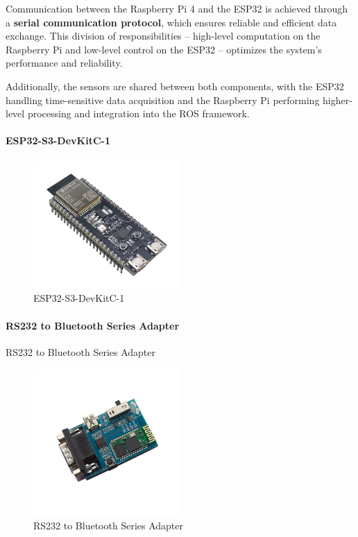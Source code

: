 \documentclass[../../main]{subfiles}
\begin{document}
Communication between the Raspberry Pi 4 and the ESP32 is achieved 
through a \textbf{serial communication protocol}, which ensures 
reliable and efficient data exchange. This division of responsibilities 
-- high-level computation on the Raspberry Pi and low-level control 
on the ESP32 -- optimizes the system's performance and reliability.

Additionally, the sensors are shared between both components, with 
the ESP32 handling time-sensitive data acquisition and the Raspberry 
Pi performing higher-level processing and integration into the ROS 
framework.

\paragraph{ESP32-S3-DevKitC-1}

\begin{figure}[H]
    \centering
    \includegraphics[width=0.5\textwidth]{fig/esp32.png}
    \caption{ ESP32-S3-DevKitC-1}
    \label{ESP32-S3-DevKitC-1} %
\end{figure}

\paragraph{RS232 to Bluetooth Series Adapter}
RS232 to Bluetooth Series Adapter
\begin{figure}[H]
    \centering
    \includegraphics[width=0.5\textwidth]{fig/bluetooth.jpg}
    \caption{ RS232 to Bluetooth Series Adapter}
    \label{RS232 to Bluetooth Series Adapter} %
\end{figure}
\end{document}
